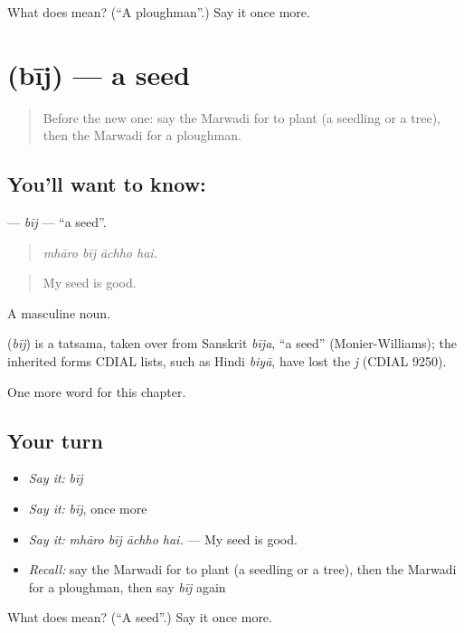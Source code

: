 \begin{tcolorbox}[breakable,colback=teal!4,colframe=teal!35!black,title={Before you move on}]
What does  mean? (\textquotedblleft{}A ploughman\textquotedblright{}.) Say it once more.
\end{tcolorbox}
\section[\texorpdfstring{\mw{बीज} (bīj)}{बीज (bīj)}]{ (bīj) — a seed}

\label{lesson:MW-C238-bij}



\begin{quote}
Before the new one: say the Marwadi for to plant (a seedling or a tree), then the Marwadi for a ploughman.
\end{quote}

\subsection*{You'll want to know: }
\textbf{} — \emph{bīj} — \textquotedblleft{}a seed\textquotedblright{}.

\begin{quote}
   
\end{quote}

\begin{quote}
\emph{mhāro bīj āchho hai.}
\end{quote}

\begin{quote}
My seed is good.
\end{quote}

A masculine noun.

\begin{cousinweb}
\textbf{} (\emph{bīj}) is a tatsama, taken over from Sanskrit \emph{bīja}, \textquotedblleft{}a seed\textquotedblright{} (Monier-Williams); the inherited forms CDIAL lists, such as Hindi \emph{biyā}, have lost the \emph{j} (CDIAL 9250).
\end{cousinweb}

\begin{grammarlens}[title={What you've built}]
One more word for this chapter.
\end{grammarlens}

\subsection*{Your turn}
\begin{itemize}
\raggedright
  \item \emph{Say it:} \emph{bīj}
  \item \emph{Say it:} \emph{bīj}, once more
  \item \emph{Say it:} \emph{mhāro bīj āchho hai.} — My seed is good.
  \item \emph{Recall:} say the Marwadi for to plant (a seedling or a tree), then the Marwadi for a ploughman, then say \emph{bīj} again
\end{itemize}

\begin{tcolorbox}[breakable,colback=teal!4,colframe=teal!35!black,title={Before you move on}]
What does  mean? (\textquotedblleft{}A seed\textquotedblright{}.) Say it once more.
\end{tcolorbox}
